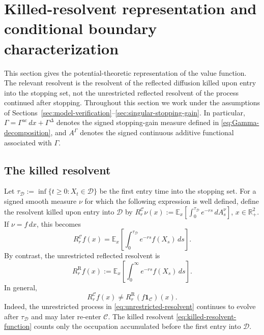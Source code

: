 \documentclass[pdflatex,sn-mathphys-num]{sn-jnl}
\theoremstyle{plain}
\theoremstyle{definition}
\newcommand{\R}{\mathbb{R}}
\begin{document}
\section{Killed-resolvent representation and conditional boundary
characterization}
\label{sec:killed-resolvent}
This section gives the potential-theoretic representation of the
value function. The relevant resolvent is the resolvent of the reflected
diffusion killed upon entry into the stopping set, not the unrestricted
reflected resolvent of the process continued after stopping. Throughout this
section we work under the assumptions of
Sections~\ref{sec:model-verification}--\ref{sec:singular-stopping-gain}. In
particular, $\Gamma=\Gamma^{\mathrm{ac}}\,dx+\Gamma^\Delta$ denotes the signed
stopping-gain measure defined in \eqref{eq:Gamma-decomposition}, and
$A^\Gamma$ denotes the signed continuous additive functional associated with
$\Gamma$.

\subsection{The killed resolvent}
\label{sec:killed-resolvent-definition}
Let $\tau_{\mathcal D}:=\inf\{t\ge0:X_t\in\mathcal D\}$ be the first entry time
into the stopping set. For a signed smooth measure $\nu$ for which the
following expression is well defined, define the resolvent killed upon entry
into $\mathcal D$ by
$\displaystyle    R_r^{\mathcal C}\nu(x)
   :=
   \mathbb E_x\left[
      \int_0^{\tau_{\mathcal D}} e^{-rs}\,dA_s^\nu
   \right]$,
$ x\in\R^2_+$.
If $\nu=f\,dx$, this becomes
\begin{equation}
\label{eq:killed-resolvent-function}
   R_r^{\mathcal C}f(x)
   =
   \mathbb E_x\left[
      \int_0^{\tau_{\mathcal D}} e^{-rs}f(X_s)\,ds
   \right].
\end{equation}
By contrast, the unrestricted reflected resolvent is
\begin{equation}
\label{eq:unrestricted-resolvent}
   R_r^{\mathrm R}f(x)
   :=
   \mathbb E_x\left[
      \int_0^\infty e^{-rs}f(X_s)\,ds
   \right].
\end{equation}
In general,
\begin{equation}
\label{eq:killed-not-unrestricted}
   R_r^{\mathcal C}f(x)
   \ne
   R_r^{\mathrm R}(f\mathbf 1_{\mathcal C})(x).
\end{equation}
Indeed, the unrestricted process in \eqref{eq:unrestricted-resolvent} continues
to evolve after $\tau_{\mathcal D}$ and may later re-enter $\mathcal C$. The
killed resolvent \eqref{eq:killed-resolvent-function} counts only the
occupation accumulated before the first entry into $\mathcal D$.
\end{document}
